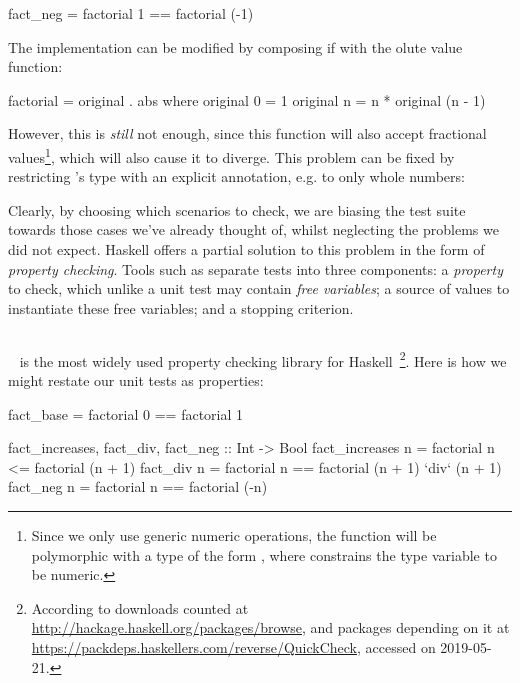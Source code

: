 \begin{haskell}
fact_neg = factorial 1 == factorial (-1)
\end{haskell}

The implementation can be modified by composing if with the olute value
function:

\begin{haskell}
factorial = original . abs
  where original 0 = 1
        original n = n * original (n - 1)
\end{haskell}

However, this is \emph{still} not enough, since this function will also accept
fractional values\footnote{Since we only use generic numeric operations, the
  function will be polymorphic with a type of the form
  , where  constrains the type variable
   to be numeric.}, which will also cause it to diverge. This problem can
be fixed by restricting 's type with an explicit annotation, e.g.
to only whole numbers: 

Clearly, by choosing which scenarios to check, we are biasing the test suite
towards those cases we've already thought of, whilst neglecting the problems we
did not expect. Haskell offers a partial solution to this problem in the form of \emph{property checking}. Tools such as \quickcheck{} separate tests into three components: a \emph{property} to check, which unlike a unit test may contain
\emph{free variables}; a source of values to instantiate these free variables; and a
stopping criterion.

\subsection{\quickcheck{}}
\label{sec:quickcheck}

\quickcheck{}~\cite{claessen2011quickcheck} is the most widely used property
checking library for
Haskell~\footnote{According to downloads counted at
  \url{http://hackage.haskell.org/packages/browse}, and packages depending on
  it at \url{https://packdeps.haskellers.com/reverse/QuickCheck}, accessed on
  2019-05-21.}. Here is how we might restate our unit tests as \quickcheck{}
properties:

\begin{haskell}
fact_base        = factorial 0 == factorial 1

fact_increases, fact_div, fact_neg :: Int -> Bool  
fact_increases n = factorial n <= factorial (n + 1)
fact_div       n = factorial n == factorial (n + 1) `div` (n + 1)
fact_neg       n = factorial n == factorial (-n)
\end{haskell}

